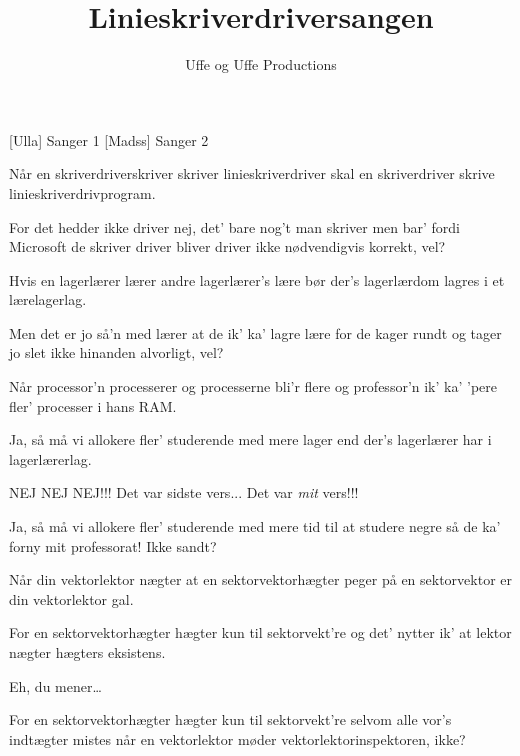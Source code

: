 \documentclass[a4paper,11pt]{article}
\title{Linieskriverdriversangen}
\author{Uffe og Uffe Productions}
\begin{document}
\maketitle

\begin{roles}
[Ulla] Sanger 1
[Madss] Sanger 2 
\end{roles}

\begin{props}
\prop{}
\end{props}

  
\begin{song}

Når en skriverdriverskriver
skriver linieskriverdriver
skal en skriverdriver skrive
linieskriverdrivprogram.

For det hedder ikke driver
nej, det' bare nog't man skriver
men bar' fordi Microsoft de skriver
driver bliver driver ikke nødvendigvis korrekt, vel?

Hvis en lagerlærer lærer
andre lagerlærer's lære
bør der's lagerlærdom lagres
i et lærelagerlag.

Men det er jo så'n med lærer
at de ik' ka' lagre lære
for de kager rundt og tager
jo slet ikke hinanden alvorligt, vel?


Når processor'n processerer
og processerne bli'r flere
og professor'n ik' ka' 'pere
fler' processer i hans RAM. 

Ja, så må vi allokere
fler' studerende med mere
lager end der's lagerlærer
har i lagerlærerlag.

 NEJ NEJ NEJ!!! Det var sidste vers... Det var \emph{mit} vers!!! 

Ja, så må vi allokere
fler' studerende med mere
tid til at studere negre
så de ka' forny mit professorat! Ikke sandt?


Når din vektorlektor nægter
at en sektorvektorhægter
peger på en sektorvektor
er din vektorlektor gal.

For en sektorvektorhægter
hægter kun til sektorvekt're
og det' nytter ik' at lektor
nægter hægters eksistens.

 Eh, du mener\ldots

 For en sektorvektorhægter
hægter kun til sektorvekt're
selvom alle vor's indtægter
mistes når en vektorlektor møder vektorlektorinspektoren, ikke?



\end{song}
\end{document}
